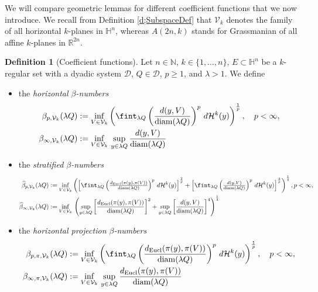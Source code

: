 \documentclass[12pt]{amsart}
\newcommand{\diam}{{\rm diam}}
\numberwithin{equation}{section}
\theoremstyle{plain}
\theoremstyle{definition}
\newtheorem{definition}[theorem]{Definition}
\theoremstyle{remark}
\begin{document}
We will compare geometric lemmas for different coefficient functions that we now introduce. We recall from Definition \ref{d;SubspaceDef} that 
$\mathcal{V}_k$ denotes the family of all horizontal $k$-planes in $\mathbb{H}^n$, whereas  $A(2n,k)$ stands for Grassmanian of all affine $k$-planes in $\mathbb{R}^{2n}$.


\begin{definition}[Coefficient functions]\label{d:Coefficient functions}
Let $n\in \mathbb{N}$, $k\in \{1,\ldots,n\}$, $E\subset \mathbb{H}^n$ be a $k$-regular set with a dyadic system $\mathcal{D}$, $Q\in \mathcal{D}$, $p\geq 1$, and $\lambda >1$. We define 
\begin{itemize}
\item the \emph{horizontal $\beta$-numbers}
\begin{align*}\beta_{p,\mathcal{V}_k}(\lambda Q)&:=\inf_{V\in\mathcal V_k}\left(\fint_{\lambda Q}\left(\frac{d(y,V)}{\diam (\lambda Q)}\right)^p\,d\mathcal{H}^k(y)\right)^{\frac{1}{p}},\quad p<\infty,\\
\beta_{\infty,\mathcal{V}_k}(\lambda Q)&:=\inf_{V\in\mathcal V_k}
\,\sup_{y\in \lambda Q} \frac{d(y,V)}{\diam (\lambda Q)}
\end{align*}
    \item  the \emph{stratified $\beta$-numbers}
    \begin{align*}\widehat{\beta}_{p,\mathcal{V}_k}(\lambda Q)&:=\inf_{V\in\mathcal V_k}\left(\left[\fint_{\lambda Q}\left(\tfrac{d_{\mathrm{Eucl}}(\pi(y),\pi(V))}{\diam (\lambda Q)}\right)^p\,d\mathcal{H}^k(y)\right]^{\frac{2}{p}}+\left[\fint_{\lambda Q}\left(\tfrac{d(y,V)}{\diam (\lambda Q)}\right)^p\,d\mathcal{H}^k(y)\right]^{\frac{4}{p}}\right)^{\frac{1}{4}}, p<\infty,\\
\widehat{\beta}_{\infty,\mathcal{V}_k}(\lambda Q)&:=\inf_{V\in\mathcal V_k}\,\left(\sup_{y\in \lambda Q}\left[\frac{d_{\mathrm{Eucl}}(\pi(y),\pi(V))}{\diam (\lambda Q)}\right]^2+\sup_{y\in \lambda Q}\left[\frac{d(y,V)}{\diam (\lambda Q)}\right]^4\right)^{\frac{1}{4}}
\end{align*}
    \item  the \emph{horizontal projection $\beta$-numbers}
    \begin{align*}\beta_{p,\pi,\mathcal{V}_k}(\lambda Q)&:=\inf_{V\in\mathcal V_k}\left(\fint_{\lambda Q}\left(\frac{d_{\mathrm{Eucl}}(\pi(y),\pi(V))}{\diam (\lambda Q)}\right)^p\,d\mathcal{H}^k(y)\right)^{\frac{1}{p}},\quad p<\infty,\\
\beta_{\infty,\pi,\mathcal{V}_k}(\lambda Q)&:=\inf_{V\in\mathcal V_k}\,  \sup_{y\in \lambda Q} \frac{d_{\mathrm{Eucl}}(\pi(y),\pi(V))}{\diam (\lambda Q)}

\end{align*}
\end{itemize}
\end{definition}
\end{document}
